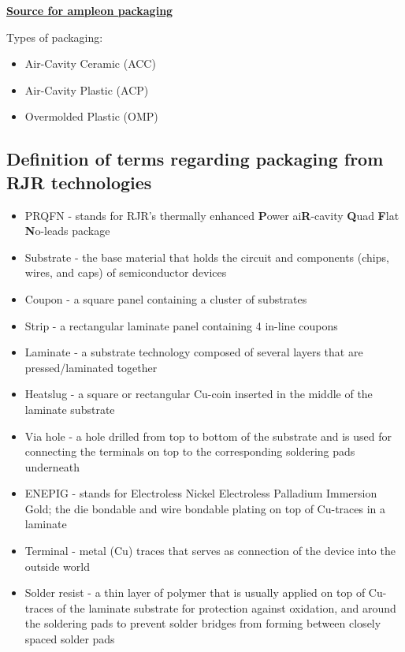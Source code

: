 \documentclass{article}
\begin{document}
\href{https://www.ampleon.com/packages.html}{\textbf{Source for ampleon packaging}}

Types of packaging:

\begin{itemize}
	\item Air-Cavity Ceramic (ACC)
	\item Air-Cavity Plastic (ACP)
	\item Overmolded Plastic (OMP)
\end{itemize}

\subsection{Definition of terms regarding packaging from RJR technologies}

\begin{itemize}
	\item PRQFN - stands for RJR's thermally enhanced \textbf{P}ower ai\textbf{R}-cavity \textbf{Q}uad \textbf{F}lat \textbf{N}o-leads package
	\item Substrate - the base material that holds the circuit and components (chips, wires, and caps) of semiconductor devices
	\item Coupon - a square panel containing a cluster of substrates
	\item Strip - a rectangular laminate panel containing 4 in-line coupons
	\item Laminate - a substrate technology composed of several layers that are pressed/laminated together
	\item Heatslug - a square or rectangular Cu-coin inserted in the middle of the laminate substrate
	\item Via hole - a hole drilled from top to bottom of the substrate and is used for connecting the terminals on top to the corresponding soldering pads underneath
	\item ENEPIG - stands for Electroless Nickel Electroless Palladium Immersion Gold; the die bondable and wire bondable plating on top of Cu-traces in a laminate
	\item Terminal - metal (Cu) traces that serves as connection of the device into the outside world
	\item Solder resist - a thin layer of polymer that is usually applied on top of Cu-traces of the laminate substrate for protection against oxidation, and around the soldering pads to prevent solder bridges from forming between closely spaced solder pads
\end{itemize}
\end{document}
